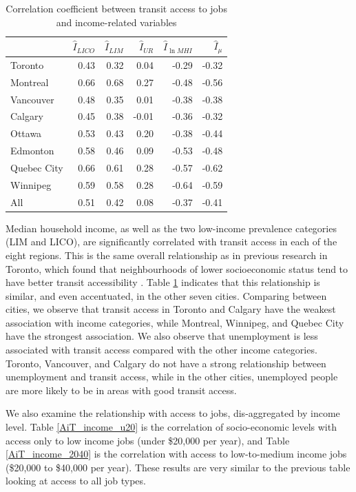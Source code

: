 \documentclass[11 pt, letterpaper]{article}
\begin{document}
{\begin{table}[H]
	\vspace{2mm}
	\centering
	\renewcommand{\arraystretch}{0.75} %
	\caption{Correlation coefficient between transit access to jobs and income-related variables}
	\label{AiT_income}
	\begin{tabular}{l|rrrrr}
		& $\hat I_{LICO}$ & $\hat I_{LIM}$  & $\hat I_{UR}$ & $\hat I_{\ln MHI}$ & $\hat I_\mu$   \\
		\hline
		Toronto     & 0.43 & 0.32 & 0.04  & -0.29 & -0.32 \\
		Montreal    & 0.66 & 0.68 & 0.27  & -0.48 & -0.56 \\
		Vancouver   & 0.48 & 0.35 & 0.01  & -0.38 & -0.38 \\
		Calgary     & 0.45 & 0.38 & -0.01 & -0.36 & -0.32 \\
		Ottawa      & 0.53 & 0.43 & 0.20  & -0.38 & -0.44 \\
		Edmonton    & 0.58 & 0.46 & 0.09  & -0.53 & -0.48 \\
		Quebec City & 0.66 & 0.61 & 0.28  & -0.57 & -0.62 \\
		Winnipeg    & 0.59 & 0.58 & 0.28  & -0.64 & -0.59 \\
		\hline
		All         & 0.51 & 0.42 & 0.08  & -0.37 & -0.41
	\end{tabular}
\end{table}

Median household income, as well as the two low-income prevalence categories (LIM and LICO), are significantly correlated with transit access in each of the eight regions. This is the same overall relationship as in previous research in Toronto, which found that neighbourhoods of lower socioeconomic status tend to have better transit accessibility \cite{foth2013,elgeneidy2016tor}. Table \ref{AiT_income} indicates that this relationship is similar, and even accentuated, in the other seven cities. Comparing between cities, we observe that transit access in Toronto and Calgary have the weakest association with income categories, while Montreal, Winnipeg, and Quebec City have the strongest association. We also observe that unemployment is less associated with transit access compared with the other income categories. Toronto, Vancouver, and Calgary do not have a strong relationship between unemployment and transit access, while in the other cities, unemployed people are more likely to be in areas with good transit access.

We also examine the relationship with access to jobs, dis-aggregated by income level. Table \ref{AiT_income_u20} is the correlation of socio-economic levels with access only to low income jobs (under \$20,000 per year), and Table \ref{AiT_income_2040} is the correlation with access to low-to-medium income jobs (\$20,000 to \$40,000 per year). These results are very similar to the previous table looking at access to all job types.

}
\end{document}

